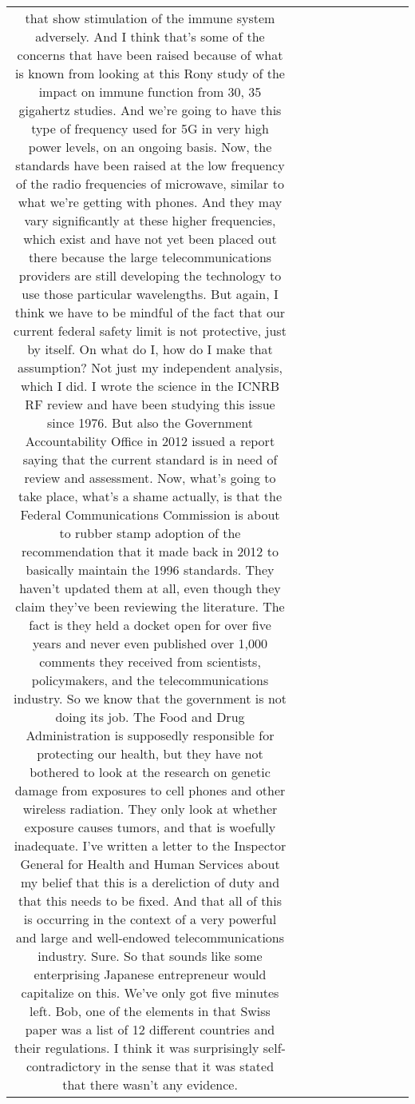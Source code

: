 \begin{table}[h!]
\begin{tabular}{|c|c|c|c|c|c|c|c|c|c|}
that show stimulation of the immune system adversely.
And I think that's some of the concerns that have been raised
because of what is known from looking at this Rony study of the impact on immune function
from 30, 35 gigahertz studies.
And we're going to have this type of frequency used for 5G in very high power levels,
on an ongoing basis.
Now, the standards have been raised at the low frequency of the radio frequencies of microwave,
similar to what we're getting with phones.
And they may vary significantly at these higher frequencies,
which exist and have not yet been placed out there
because the large telecommunications providers are still developing the technology
to use those particular wavelengths.
But again, I think we have to be mindful of the fact
that our current federal safety limit is not protective,
just by itself.
On what do I, how do I make that assumption?
Not just my independent analysis, which I did.
I wrote the science in the ICNRB RF review
and have been studying this issue since 1976.
But also the Government Accountability Office in 2012 issued a report saying that the current standard is in need of review and assessment.
Now, what's going to take place, what's a shame actually,
is that the Federal Communications Commission is about to rubber stamp adoption of the recommendation
that it made back in 2012 to basically maintain the 1996 standards.
They haven't updated them at all, even though they claim they've been reviewing the literature.
The fact is they held a docket open for over five years and never even published over 1,000 comments they received from scientists,
policymakers, and the telecommunications industry.
So we know that the government is not doing its job.
The Food and Drug Administration is supposedly responsible for protecting our health,
but they have not bothered to look at the research on genetic damage from exposures to cell phones and other wireless radiation.
They only look at whether exposure causes tumors, and that is woefully inadequate.
I've written a letter to the Inspector General for Health and Human Services about my belief that this is a dereliction of duty and that this needs to be fixed.
And that all of this is occurring in the context of a very powerful and large and well-endowed telecommunications industry.
Sure.
So that sounds like some enterprising Japanese entrepreneur would capitalize on this.
We've only got five minutes left.
Bob, one of the elements in that Swiss paper was a list of 12 different countries and their regulations.
I think it was surprisingly self-contradictory in the sense that it was stated that there wasn't any evidence.

\end{tabular}
\end{table}
